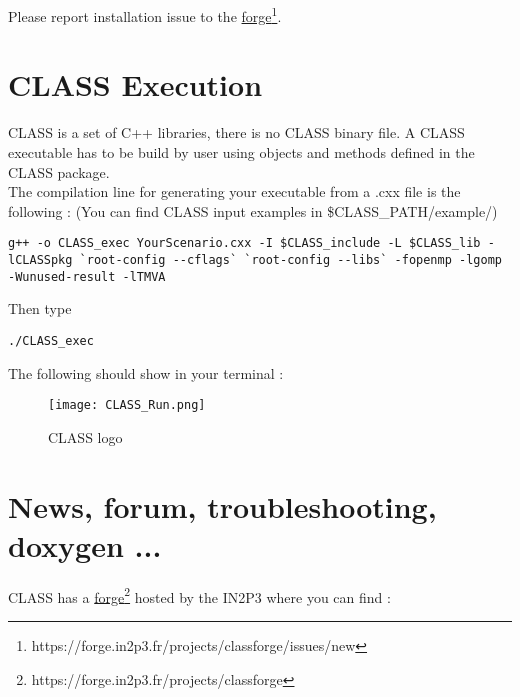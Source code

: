 Please report installation issue to the \href{https://forge.in2p3.fr/projects/classforge/issues/new}{forge}\footnote{https://forge.in2p3.fr/projects/classforge/issues/new}.

\chapter{CLASS Execution}
CLASS is a set of C++ libraries, there is no CLASS binary file. A CLASS executable has to be build by user using objects and methods defined in the CLASS package. \\
The compilation line for generating your executable from a .cxx file is the following :
(You can find CLASS input examples in \$CLASS\_PATH/example/)

\begin{center}
\begin{minipage}{\textwidth}
\begin{lstlisting}[style=terminal]
g++ -o CLASS_exec YourScenario.cxx -I $CLASS_include -L $CLASS_lib -lCLASSpkg `root-config --cflags` `root-config --libs` -fopenmp -lgomp -Wunused-result -lTMVA
\end{lstlisting}
\end{minipage}
\end{center}
Then type 
\begin{center}
\begin{minipage}{\textwidth}
\begin{lstlisting}[style=terminal]
./CLASS_exec
\end{lstlisting}
\end{minipage}
\end{center}

The following should show in your terminal :

    \begin{figure}[H]
    \centering
    \centerline{\texttt{[image: CLASS\_Run.png]}}
    \caption{CLASS logo}
    \label{fig:CLASSLogo}
    \end{figure}




\chapter{News, forum, troubleshooting, doxygen ...}
CLASS has a \href{https://forge.in2p3.fr/projects/classforge}{forge}\footnote{https://forge.in2p3.fr/projects/classforge} hosted by the IN2P3  where you can find :

